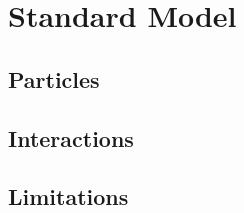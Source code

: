 \chapter{Standard Model}

\label{ch:standardmodel}

\section{Particles}


\section{Interactions}


\section{Limitations}

